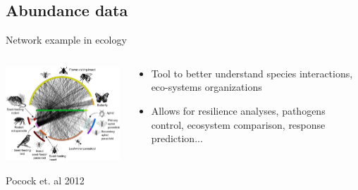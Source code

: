 \documentclass[11pt]{beamer}
\begin{document}
\subsection{Abundance data}
\begin{frame}{Network example in ecology}
\begin{columns}

\begin{column}{7.5cm}
\includegraphics[width=8cm]{Species-interaction-networks-at-Norwood-Farm-Somerset-UK-revised-from-Pocock-et-al.png}

\footnotesize{Pocock et. al 2012}
\end{column}

\begin{column}{4.5cm}
\begin{itemize}
    \item Tool to better understand species interactions, eco-systems organizations
    \item Allows for resilience analyses, pathogens control, ecosystem comparison, response prediction...
\end{itemize}
\end{column}

\end{columns}
    
\end{frame}
\end{document}
